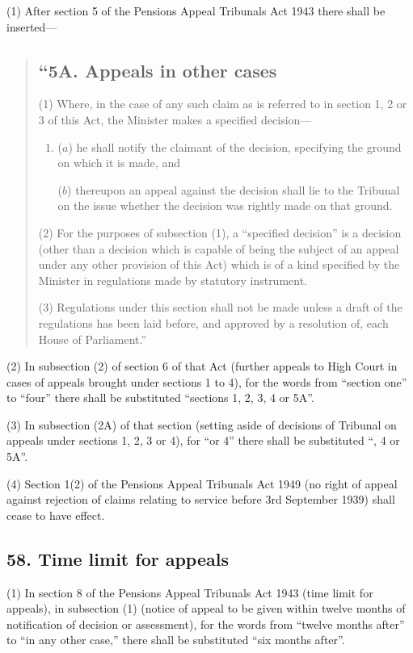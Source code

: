 \documentclass[12pt,a4paper]{article}
\begin{document}
(1) After section 5 of the Pensions Appeal Tribunals Act 1943 there shall be inserted—
\begin{quotation}
\subsection*{“5A. Appeals in other cases}

(1) Where, in the case of any such claim as is referred to in section 1, 2 or 3 of this Act, the Minister makes a specified decision—
\begin{enumerate}\item[]
($a$) he shall notify the claimant of the decision, specifying the ground on which it is made, and

($b$) thereupon an appeal against the decision shall lie to the Tribunal on the issue whether the decision was rightly made on that ground.
\end{enumerate}

(2) For the purposes of subsection (1), a “specified decision” is a decision (other than a decision which is capable of being the subject of an appeal under any other provision of this Act) which is of a kind specified by the Minister in regulations made by statutory instrument.

(3) Regulations under this section shall not be made unless a draft of the regulations has been laid before, and approved by a resolution of, each House of Parliament.”
\end{quotation}

(2) In subsection (2)  of section 6 of that Act (further appeals to High Court in cases of appeals brought under sections 1 to 4), for the words from “section one” to “four” there shall be substituted “sections 1, 2, 3, 4 or 5A”.

(3) In subsection (2A)  of that section (setting aside of decisions of Tribunal on appeals under sections 1, 2, 3 or 4), for “or 4” there shall be substituted “, 4 or 5A”.

(4) Section 1(2)  of the Pensions Appeal Tribunals Act 1949 (no right of appeal against rejection of claims relating to service before 3rd September 1939) shall cease to have effect.

\subsection{58. Time limit for appeals}

(1) In section 8 of the Pensions Appeal Tribunals Act 1943 (time limit for appeals), in subsection (1)  (notice of appeal to be given within twelve months of notification of decision or assessment), for the words from “twelve months after” to “in any other case,” there shall be substituted “six months after”.
\end{document}
